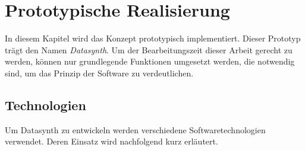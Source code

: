 \documentclass[a4paper, 12pt, DIV=calc, version=first, pdftex, headsepline, footsepline, bibtotocnumbered, liststotocnumbered]{scrreprt}
\begin{document}
\chapter{Prototypische Realisierung}
\label{cha:Umsetzung}
In diesem Kapitel wird das Konzept prototypisch implementiert.
Dieser Prototyp trägt den Namen \textit{Datasynth}.
Um der Bearbeitungszeit dieser Arbeit gerecht zu werden, können nur grundlegende Funktionen
umgesetzt werden, die notwendig sind, um das Prinzip der Software zu verdeutlichen.

\section{Technologien}
\label{sec:Technologien}
Um Datasynth zu entwickeln werden verschiedene Softwaretechnologien verwendet.
Deren Einsatz wird nachfolgend kurz erläutert.
\end{document}
